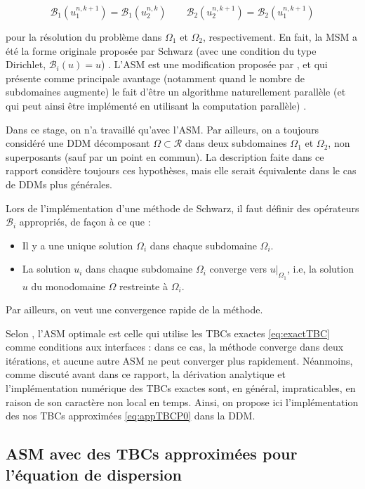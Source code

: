 $$\mathcal{B}_1(u_1^{n,k+1}) = \mathcal{B}_1(u_2^{n,k}) \qquad \mathcal{B}_2(u_2^{n,k+1}) = \mathcal{B}_2(u_1^{n,k+1})$$

\noindent pour la résolution du problème dans $\Omega_1$ et $\Omega_2$, respectivement. En fait, la MSM a été la forme originale proposée par Schwarz (avec une condition du type Dirichlet, $\mathcal{B}_i(u) = u$)  \cite{Japhet2003,Lions1990}. L'ASM est une modification proposée par \cite{Lions1988}, et qui présente comme principale avantage (notamment quand le nombre de subdomaines augmente) le fait d'être un algorithme naturellement parallèle (et qui peut ainsi être implémenté en utilisant la computation parallèle) \cite{Lions1988}.

\indent Dans ce stage, on n'a travaillé qu'avec l'ASM. Par ailleurs, on a toujours considéré une DDM décomposant $\Omega \subset \mathcal{R}$ dans deux subdomaines $\Omega_1$ et $\Omega_2$, non superposants (sauf par un point en commun). La description faite dans ce rapport considère toujours ces hypothèses, mais elle serait équivalente dans le cas de DDMs plus générales.

\indent Lors de l'implémentation d'une méthode de Schwarz, il faut définir des opérateurs $\mathcal{B}_i$ appropriés, de façon à ce que :

\begin{itemize}
   	\item Il y a une unique solution $\Omega_i$ dans chaque subdomaine $\Omega_i$.
	\item La solution $u_i$ dans chaque subdomaine $\Omega_i$ converge vers $u|_{\Omega_1}$, i.e, la solution $u$ du monodomaine $\Omega$ restreinte à $\Omega_i$.
\end{itemize}

\indent Par ailleurs, on veut une convergence rapide de la méthode.

\indent Selon \cite{Japhet2003}, l'ASM optimale est celle qui utilise les TBCs exactes \eqref{eq:exactTBC} comme conditions aux interfaces : dans ce cas, la méthode converge dans deux itérations, et aucune autre ASM ne peut converger plus rapidement. Néanmoins, comme discuté avant dans ce rapport, la dérivation analytique et l'implémentation numérique des TBCs exactes sont, en général, impraticables, en raison de son caractère non local en temps. Ainsi, on propose ici l'implémentation des nos TBCs approximées \eqref{eq:appTBCP0} dans la DDM.

\subsection{ASM avec des TBCs approximées pour l'équation de dispersion}

